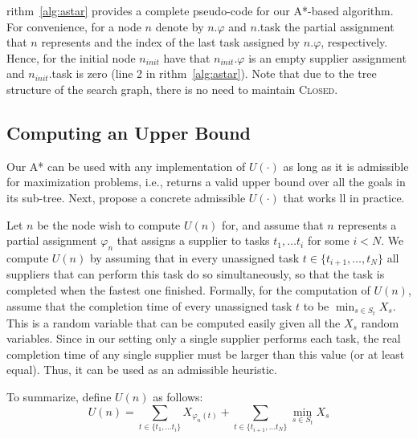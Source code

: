 \documentclass[letterpaper]{article} %
\newcommand{\astar}{\textsc{A*}\xspace}
\newcommand{\closed}{\textsc{Closed}\xspace}
\newcommand\Roni[1]{\nb{\textbf{Roni:}}{blue}{#1}}
\begin{document}
rithm~\ref{alg:astar} provides a complete pseudo-code for our \astar-based algorithm. For convenience, for a node $n$  denote by $n.\varphi$ and $n$.task
the partial assignment that $n$ represents and the index of the last task assigned by $n.\varphi$, respectively. Hence, for the initial node $n_{init}$  have that $n_{init}.\varphi$ is an empty supplier assignment and $n_{init}.$task is zero (line 2 in rithm~\ref{alg:astar}). Note that due to the tree structure of the search graph, there is no need to maintain \closed.


\subsection{Computing an Upper Bound}

Our \astar can be used with any implementation of $U(\cdot)$ as long as it is admissible for maximization problems, i.e., returns a valid upper bound over all the goals in its sub-tree. Next,  propose a concrete admissible $U(\cdot)$ that works ll in practice.

Let $n$ be the node  wish to compute $U(n)$ for, and assume that $n$ represents a partial assignment $\varphi_n$ that assigns a supplier to tasks $t_1,\ldots t_i$ for some $i<N$.
We compute $U(n)$ by assuming that in every unassigned task $t\in \{t_{i+1},\ldots,t_{N}\}$
all suppliers that can perform this task do so simultaneously, so that the task is completed
when the fastest one finished. Formally, for the computation of $U(n)$,  assume that the completion time of every unassigned task $t$ to be $\min_{s\in S_t} X_s$. This is a random variable that can be computed easily given all the $X_s$ random variables. Since in our setting only a single supplier performs each task, the real completion time of any single supplier must be larger than this value (or at least equal). Thus, it can be used as an admissible heuristic.

To summarize,  define $U(n)$ as follows:
\begin{equation}
U(n)=\sum_{t\in \{t_1,\ldots t_i\}} X_{\varphi_n(t)} + \sum_{t\in \{t_{i+1},\ldots t_{N}\}} \min_{s\in S_t} X_s
\label{eq:heuristic}
\end{equation}

\end{document}
